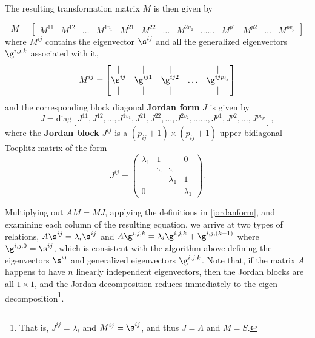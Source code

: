 \endmylist
The resulting transformation matrix $M$ is then given by
\setcounter{MaxMatrixCols}{30}
\begin{subeqnA}\label{jordanform}
\begin{equation}
  M=\begin{bmatrix} M^{11} & M^{12} & \ldots & M^{1v_1} &  M^{21} & M^{22} & \ldots & M^{2v_2} & \ldots\ldots &
 M^{p1} & M^{p2} & \ldots & M^{p v_p} \end{bmatrix}
 \label{jordanform;a}
\end{equation}
where $M^{ij}$ contains the eigenvector $\s^{ij}$ and all the generalized eigenvectors $\g^{i,j,k}$ associated with it,
\begin{equation}
M^{ij} = \begin{bmatrix} | & | & | & ~ & | \\ \s^{ij} & \g^{ij1} & \g^{ij2} & \ldots & \g^{ijp_{ij}} \\ | & | & | & ~ & | \end{bmatrix}
\label{jordanform;b}
\end{equation}
and the corresponding block diagonal {\bf Jordan form} $J$ is given by
\begin{equation}
       J=\textrm{diag}[ J^{11}, J^{12}, \ldots, J^{1v_1},  J^{21}, J^{22}, \ldots, J^{2v_2}, \ldots\ldots, J^{p1}, J^{p2}, \ldots, J^{p v_p} ],
       \label{jordanform;c}
\end{equation}
where the {\bf Jordan block} $J^{ij}$ is a $(p_{ij}+1)\times(p_{ij}+1)$ upper bidiagonal Toeplitz matrix of the form
\begin{equation}
    J^{ij}=\begin{pmatrix} \lambda_1 & 1         &    & 0 \\ 
                                     & \ddots & \ddots & \\ 
                                     &        & \lambda_1 & 1 \\
                                0    &        &  & \lambda_1 \end{pmatrix}.
\label{jordanform;d}
\end{equation}
\end{subeqnA}
Multiplying out $AM=MJ$, applying the definitions in \eqref{jordanform}, and examining each column of the resulting equation, we arrive at two types
of relations,  $A\s^{ij}=\lambda_i \s^{ij}$ and $A\g^{i,j,k}=\lambda_i\g^{i,j,k}+\g^{i,j,(k-1)}$ where $\g^{i,j,0}=\s^{ij}$,
which is consistent with the algorithm above defining the eigenvectors $\s^{ij}$ and generalized eigenvectors $\g^{i,j,k}$.
Note that, if the matrix $A$ happens to have $n$ linearly independent eigenvectors, then the Jordan blocks are all $1\times 1$, and the Jordan
decomposition reduces immediately to the eigen decomposition\footnote{That is, $J^{ij}=\lambda_i$ and $M^{ij}=\s^{ij}$, and thus $J=\Lambda$ and $M=S$.}.

